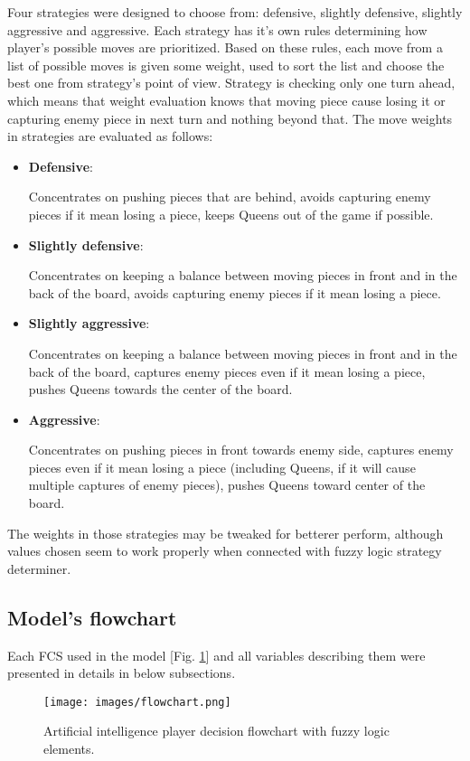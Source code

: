 \documentclass{article}
\begin{document}
Four strategies were designed to choose from: defensive, slightly defensive, slightly aggressive and aggressive. Each strategy has it's own rules determining how player's possible moves are prioritized. Based on these rules, each move from a list of possible moves is given some weight, used to sort the list and choose the best one from strategy's point of view. Strategy is checking only one turn ahead, which means that weight evaluation knows that moving piece cause losing it or capturing enemy piece in next turn and nothing beyond that. The move weights in strategies are evaluated as follows:
\begin{itemize} 
\item \textbf{Defensive}:
    
    Concentrates on pushing pieces that are behind, avoids capturing enemy pieces if it mean losing a piece, keeps Queens out of the game if possible.
\item \textbf{Slightly defensive}:

   Concentrates on keeping a balance between moving pieces in front and in the back of the board, avoids capturing enemy pieces if it mean losing a piece.
\item \textbf{Slightly aggressive}:

   Concentrates on keeping a balance between moving pieces in front and in the back of the board, captures enemy pieces even if it mean losing a piece, pushes Queens towards the center of the board.
\item \textbf{Aggressive}:

   Concentrates on pushing pieces in front towards enemy side, captures enemy pieces even if it mean losing a piece (including Queens, if it will cause multiple captures of enemy pieces), pushes Queens toward center of the board.
\end{itemize}

The weights in those strategies may be tweaked for betterer perform, although values chosen seem to work properly when connected with fuzzy logic strategy determiner.

\subsection{Model's flowchart}

Each FCS used in the model [Fig. \ref{fig:flowchart}] and all variables describing them were presented in details in below subsections. 

\begin{figure}[tbhp]
  \centering
      \texttt{[image: images/flowchart.png]}
  \caption{Artificial intelligence player decision flowchart with fuzzy logic elements.}
  \label{fig:flowchart}
\end{figure}
\end{document}
